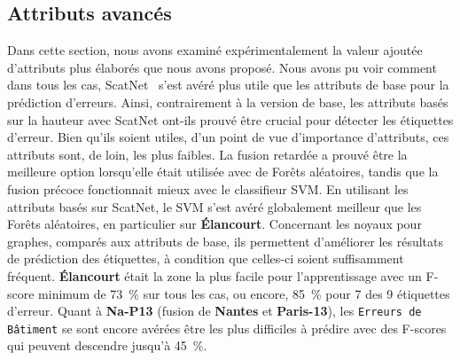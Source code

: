     \subsection*{Attributs avancés}
        Dans cette section, nous avons examiné expérimentalement la valeur ajoutée d'attributs plus élaborés que nous avons proposé.
        Nous avons pu voir comment dans tous les cas, ScatNet~\parencite{mallat2012group,sifre2013rotation,oyallon2015deep} s'est avéré plus utile que les attributs de base pour la prédiction d'erreurs.
        Ainsi, contrairement à la version de base, les attributs basés sur la hauteur avec ScatNet ont-ils prouvé être crucial pour détecter les étiquettes d'erreur.
        Bien qu'ils soient utiles, d'un point de vue d'importance d'attributs, ces attributs sont, de loin, les plus faibles.
        La fusion retardée a prouvé être la meilleure option lorsqu'elle était utilisée avec de Forêts aléatoires, tandis que la fusion précoce fonctionnait mieux avec le classifieur SVM.
        En utilisant les attributs basés sur ScatNet, le SVM s'est avéré globalement meilleur que les Forêts aléatoires, en particulier sur \textbf{\'Elancourt}.
        Concernant les noyaux pour graphes, comparés aux attributs de base, ils permettent d'améliorer les résultats de prédiction des étiquettes, à condition que celles-ci soient suffisamment fréquent.
        \textbf{\'Elancourt} était la zone la plus facile pour l'apprentissage avec un F-score minimum de \SI[locale=FR]{73}{\percent} sur tous les cas, ou encore, \SI[locale=FR]{85}{\percent} pour 7 des 9 étiquettes d'erreur.
        Quant à \textbf{Na-P13} (fusion de \textbf{Nantes} et \textbf{Paris-13}), les \texttt{Erreurs de Bâtiment} se sont encore avérées être les plus difficiles à prédire avec des F-scores qui peuvent descendre jusqu'à \SI[locale=FR]{45}{\percent}.
        

